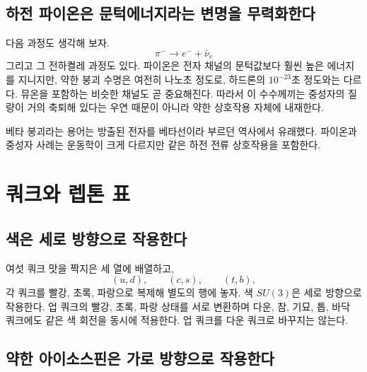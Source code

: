 \subsection{하전 파이온은 문턱에너지라는 변명을 무력화한다}

다음 과정도 생각해 보자.
\begin{equation}
\pi^-\longrightarrow e^-+\bar\nu_e
\end{equation} 그리고 그 전하켤레 과정도 있다. 파이온은 전자 채널의 문턱값보다 훨씬 높은 에너지를 지니지만, 약한 붕괴 수명은 여전히 나노초 정도로, 하드론의 \(10^{-23}\)초 정도와는 다르다. 뮤온을 포함하는 비슷한 채널도 곧 중요해진다. 따라서 이 수수께끼는 중성자의 질량이 거의 축퇴해 있다는 우연 때문이 아니라 약한 상호작용 자체에 내재한다.


베타 붕괴라는 용어는 방출된 전자를 베타선이라 부르던 역사에서 유래했다. 파이온과 중성자 사례는 운동학이 크게 다르지만 같은 하전 전류 상호작용을 포함한다.

\section{쿼크와 렙톤 표}

\subsection{색은 세로 방향으로 작용한다}

여섯 쿼크 맛을 짝지은 세 열에 배열하고,
\begin{equation}
(u,d),\qquad(c,s),\qquad(t,b),
\end{equation} 각 쿼크를 빨강, 초록, 파랑으로 복제해 별도의 행에 놓자. 색 \(SU(3)\)은 세로 방향으로 작용한다. 업 쿼크의 빨강, 초록, 파랑 상태를 서로 변환하며 다운, 참, 기묘, 톱, 바닥 쿼크에도 같은 색 회전을 동시에 적용한다. 업 쿼크를 다운 쿼크로 바꾸지는 않는다.

\subsection{약한 아이소스핀은 가로 방향으로 작용한다}

